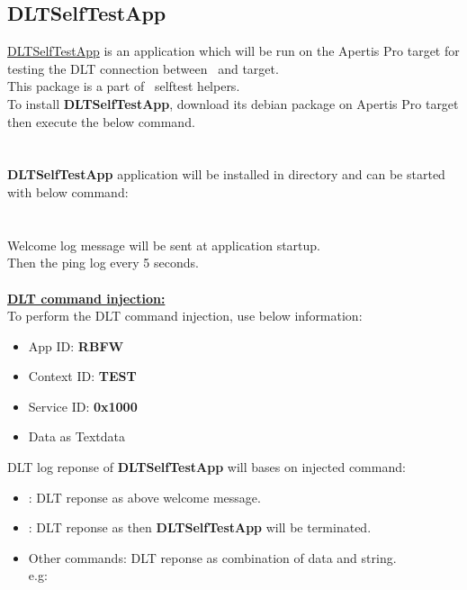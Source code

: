 \subsection{DLTSelfTestApp}
\href{https://sourcecode.socialcoding.bosch.com/projects/ROBFW/repos/selftest/browse/helpers/DLT}
{DLTSelfTestApp} is an application which will be run on the Apertis Pro target for
testing the DLT connection between \rfw\ and target.\\
This package is a part of \rfw\ selftest helpers.\\
To install \textbf{DLTSelfTestApp}, download its debian package on Apertis Pro
target then execute the below command.\\
\\
\\
\textbf{DLTSelfTestApp} application will be installed in
 directory and can be started with below command:\\
\\
\\
Welcome log message 
will be sent at application startup.\\
Then the ping log 
every 5 seconds.\\
\\
\textbf{\underline{DLT command injection:}}\\
To perform the DLT command injection, use below information:
\begin{itemize}
   \item App ID: \textbf{RBFW}
   \item Context ID: \textbf{TEST}
   \item Service ID: \textbf{0x1000}
   \item Data as Textdata
\end{itemize}

DLT log reponse of \textbf{DLTSelfTestApp} will bases on injected command:
\begin{itemize}
   \item {}: DLT reponse as above welcome message.
   \item {}: DLT reponse as  then \textbf{DLTSelfTestApp}
                       will be terminated.
   \item Other commands: DLT reponse as combination of data and string.\\
   e.g: 
\end{itemize}

